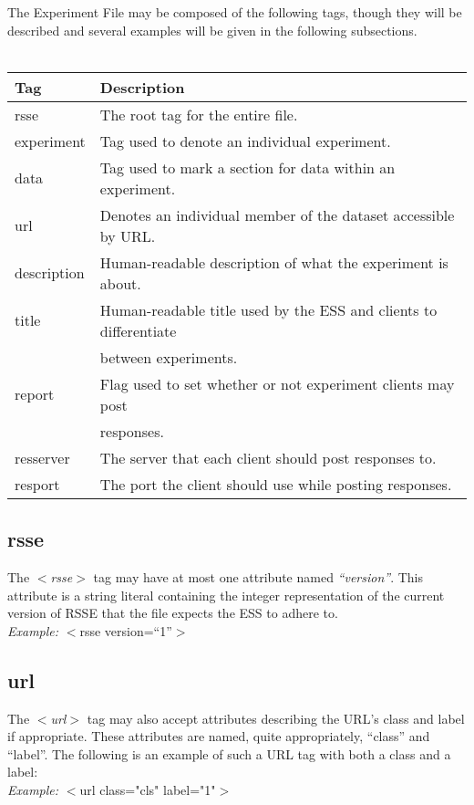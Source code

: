 \documentclass[letterpaper]{article}
\begin{document}
The Experiment File may be composed of the following tags, though they will be described and several examples will be given in the following subsections.
\\
\\
\begin{tabular}{|l|l|}
\hline
\textbf{Tag} & \textbf{Description} \\
\hline
\hline
rsse & The root tag for the entire file. \\
\hline
experiment & Tag used to denote an individual experiment. \\
\hline
data & Tag used to mark a section for data within an experiment. \\
\hline
url & Denotes an individual member of the dataset accessible by URL.\\
\hline
description & Human-readable description of what the experiment is about.\\
\hline
title & Human-readable title used by the ESS and clients to differentiate\\
      & between experiments.\\
\hline
report & Flag used to set whether or not experiment clients may post\\ 
       & responses.\\
\hline
resserver & The server that each client should post responses to. \\
\hline
resport & The port the client should use while posting responses.\\
\hline
\end{tabular}

\subsection{rsse}
The \textit{$<$rsse$>$} tag may have at most one attribute named \textit{``version''}. This attribute is a string literal containing the integer representation of the current version of RSSE that the file expects the ESS to adhere to. 
\\
\textit{Example:} $<$rsse version=``1''$>$\\

\subsection{url}
The \textit{$<$url$>$} tag may also accept attributes describing the URL's class and label if appropriate. These attributes are named, quite appropriately, ``class'' and ``label''. The following is an example of such a URL tag with both a class and a label:
\\
\textit{Example:} $<$url class="cls" label="1"$>$
\end{document}
